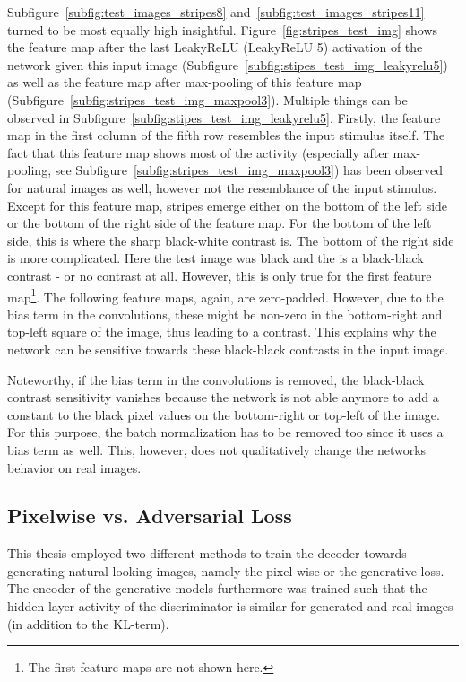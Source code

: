 Subfigure~\ref{subfig:test_images_stripes8} and~\ref{subfig:test_images_stripes11} turned to be most equally high insightful.
Figure~\ref{fig:stripes_test_img} shows the feature map after the last LeakyReLU (LeakyReLU 5) activation of the network given this input image (Subfigure~\ref{subfig:stipes_test_img_leakyrelu5}) as well as the feature map after max-pooling of this feature map (Subfigure~\ref{subfig:stripes_test_img_maxpool3}).
Multiple things can be observed in Subfigure~\ref{subfig:stipes_test_img_leakyrelu5}.
Firstly, the feature map in the first column of the fifth row resembles the input stimulus itself.
The fact that this feature map shows most of the activity (especially after max-pooling, see Subfigure~\ref{subfig:stripes_test_img_maxpool3}) has been observed for natural images as well, however not the resemblance of the input stimulus.
Except for this feature map, stripes emerge either on the bottom of the left side or the bottom of the right side of the feature map.
For the bottom of the left side, this is where the sharp black-white contrast is.
The bottom of the right side is more complicated.
Here the test image was black and the  is a black-black contrast - or no contrast at all.
However, this is only true for the first feature map\footnote{The first feature maps are not shown here.}.
The following feature maps, again, are zero-padded.
However, due to the bias term in the convolutions, these might be non-zero in the bottom-right and top-left square of the image, thus leading to a contrast.
This explains why the network can be sensitive towards these black-black contrasts in the input image.

Noteworthy, if the bias term in the convolutions is removed, the black-black contrast sensitivity vanishes because the network is not able anymore to add a constant to the black pixel values on the bottom-right or top-left of the image.
For this purpose, the batch normalization has to be removed too since it uses a bias term as well.
This, however, does not qualitatively change the networks behavior on real images.

\subsection{Pixelwise vs. Adversarial Loss}\label{subsec:pixelwise-vs.-adversarial-loss}
This thesis employed two different methods to train the decoder towards generating natural looking images, namely the pixel-wise or the generative loss.
The encoder of the generative models furthermore was trained such that the hidden-layer activity of the discriminator is similar for generated and real images (in addition to the KL-term).

